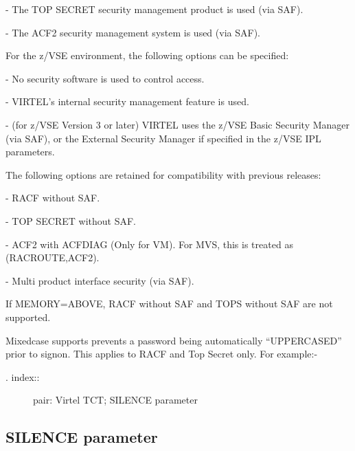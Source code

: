 \documentclass[letterpaper,10pt,english]{sphinxmanual}
\begin{document}
 - The TOP SECRET security management product is used (via SAF).

 - The ACF2 security management system is used (via SAF).

For the z/VSE environment, the following options can be specified:

 - No security software is used to control access.

 - VIRTEL’s internal security management feature is used.

 - (for z/VSE Version 3 or later) VIRTEL uses the z/VSE Basic Security Manager (via SAF), or the External Security Manager if specified in the z/VSE IPL parameters.

The following options are retained for compatibility with previous releases:

 - RACF without SAF.

 - TOP SECRET without SAF.

 - ACF2 with ACFDIAG (Only for VM). For MVS, this is treated as (RACROUTE,ACF2).

 - Multi product interface security (via SAF).

If MEMORY=ABOVE, RACF without SAF and TOPS without SAF are not supported.

Mixedcase supports prevents a password being automatically “UPPERCASED” prior to signon. This applies to RACF and Top Secret only. For example:-

\begin{sphinxVerbatim}[commandchars=\\\{\}]
\end{sphinxVerbatim}
\begin{description}
\item[{. index::}] \leavevmode
pair: Virtel TCT; SILENCE parameter

\end{description}


\subsection{SILENCE parameter}
\label{\detokenize{Installation_Guide:silence-parameter}}
\begin{sphinxVerbatim}[commandchars=\\\{\}]
 
\end{sphinxVerbatim}
\end{document}
